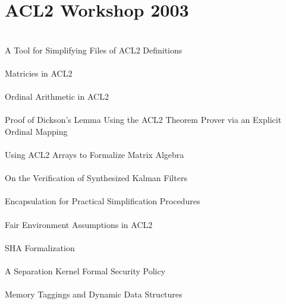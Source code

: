 \documentclass{article}
\begin{document}
\section{ACL2 Workshop 2003}

\cite{03-kaufmann-simplifying} \\
A Tool for Simplifying Files of ACL2 Definitions \\

\cite{03-hendrix-matricies} \\
Matricies in ACL2 \\

\cite{03-manolios-ordinal} \\
Ordinal Arithmetic in ACL2 \\

\cite{03-sustik-dickson} \\
Proof of Dickson's Lemma Using the ACL2 Theorem Prover via an Explicit Ordinal Mapping \\

\cite{03-gamboa-arrays} \\
Using ACL2 Arrays to Formalize Matrix Algebra \\

\cite{03-gamboa-kalman} \\
On the Verification of Synthesized Kalman Filters \\

\cite{03-matlin-encapsulation} \\
Encapsulation for Practical Simplification Procedures \\

\cite{03-sumners-fairness} \\
Fair Environment Assumptions in ACL2 \\

\cite{03-toma-sha} \\
SHA Formalization \\

\cite{03-greve-separation} \\
A Separation Kernel Formal Security Policy \\

\cite{03-moore-tagging} \\
Memory Taggings and Dynamic Data Structures \\
\end{document}
